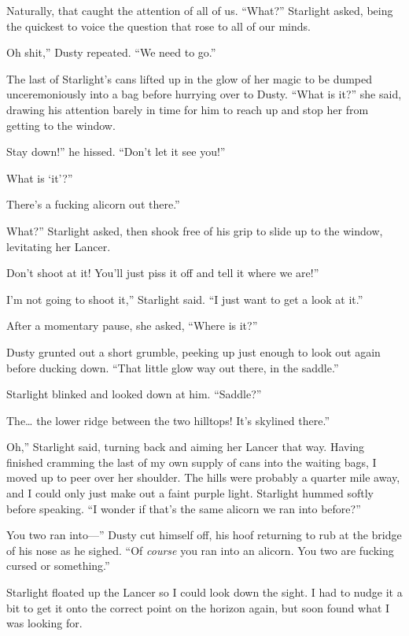 Naturally, that caught the attention of all of us. “What?” Starlight asked, being the quickest to voice the question that rose to all of our minds.

\leavevmode{}Oh shit,” Dusty repeated. “We need to go.”

The last of Starlight’s cans lifted up in the glow of her magic to be dumped unceremoniously into a bag before hurrying over to Dusty. “What is it?” she said, drawing his attention barely in time for him to reach up and stop her from getting to the window.

\leavevmode{}Stay down!” he hissed. “Don’t let it see you!”

\leavevmode{}What is ‘it’?”

\leavevmode{}There’s a fucking alicorn out there.”

\leavevmode{}What?” Starlight asked, then shook free of his grip to slide up to the window, levitating her Lancer.

\leavevmode{}Don’t shoot at it! You’ll just piss it off and tell it where we are!”

\leavevmode{}I’m not going to shoot it,” Starlight said. “I just want to get a look at it.”

After a momentary pause, she asked, “Where is it?”

Dusty grunted out a short grumble, peeking up just enough to look out again before ducking down. “That little glow way out there, in the saddle.”

Starlight blinked and looked down at him. “Saddle?”

\leavevmode{}The… the lower ridge between the two hilltops! It’s skylined there.”

\leavevmode{}Oh,” Starlight said, turning back and aiming her Lancer that way. Having finished cramming the last of my own supply of cans into the waiting bags, I moved up to peer over her shoulder. The hills were probably a quarter mile away, and I could only just make out a faint purple light. Starlight hummed softly before speaking. “I wonder if that’s the same alicorn we ran into before?”

\leavevmode{}You two ran into—” Dusty cut himself off, his hoof returning to rub at the bridge of his nose as he sighed. “Of \textit{course} you ran into an alicorn. You two are fucking cursed or something.”

Starlight floated up the Lancer so I could look down the sight. I had to nudge it a bit to get it onto the correct point on the horizon again, but soon found what I was looking for.

